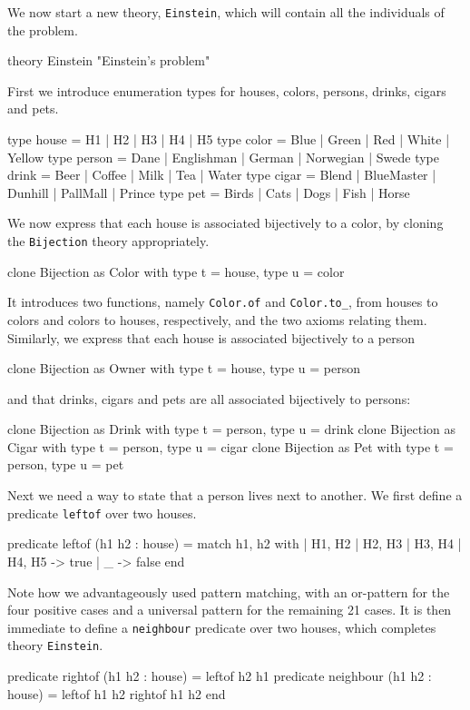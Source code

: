 We now start a new theory, \texttt{Einstein}, which will contain all
the individuals of the problem.
\begin{whycode}
theory Einstein "Einstein's problem"
\end{whycode}
First we introduce enumeration types for houses, colors, persons,
drinks, cigars and pets.
\begin{whycode}
  type house  = H1 | H2 | H3 | H4 | H5
  type color  = Blue | Green | Red | White | Yellow
  type person = Dane | Englishman | German | Norwegian | Swede
  type drink  = Beer | Coffee | Milk | Tea | Water
  type cigar  = Blend | BlueMaster | Dunhill | PallMall | Prince
  type pet    = Birds | Cats | Dogs | Fish | Horse
\end{whycode}
We now express that each house is associated bijectively to a color,
by cloning the \texttt{Bijection} theory appropriately.
\begin{whycode}
  clone Bijection as Color with type t = house, type u = color
\end{whycode}
It introduces two functions, namely \texttt{Color.of} and
\texttt{Color.to\_}, from houses to colors and colors to houses,
respectively, and the two axioms relating them.
Similarly, we express that each house is associated bijectively to a
person
\begin{whycode}
  clone Bijection as Owner with type t = house, type u = person
\end{whycode}
and that drinks, cigars and pets are all associated bijectively to persons:
\begin{whycode}
  clone Bijection as Drink with type t = person, type u = drink
  clone Bijection as Cigar with type t = person, type u = cigar
  clone Bijection as Pet   with type t = person, type u = pet
\end{whycode}
Next we need a way to state that a person lives next to another. We
first define a predicate \texttt{leftof} over two houses.
\begin{whycode}
  predicate leftof (h1 h2 : house) =
    match h1, h2 with
    | H1, H2
    | H2, H3
    | H3, H4
    | H4, H5 -> true
    | _      -> false
    end
\end{whycode}
Note how we advantageously used pattern matching, with an or-pattern
for the four positive cases and a universal pattern for the remaining
21 cases. It is then immediate to define a \texttt{neighbour}
predicate over two houses, which completes theory \texttt{Einstein}.
\begin{whycode}
  predicate rightof (h1 h2 : house) =
    leftof h2 h1
  predicate neighbour (h1 h2 : house) =
    leftof h1 h2 \/ rightof h1 h2
end
\end{whycode}

